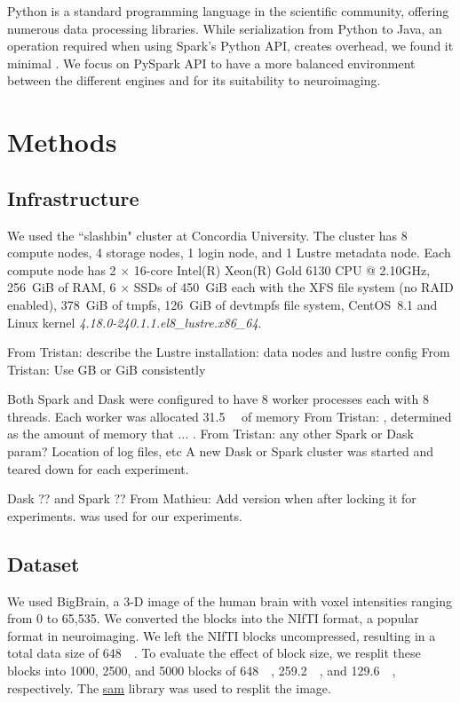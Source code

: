 \documentclass[conference]{IEEEtran}
\newcommand{\TG}[1]{\color{cyan}From Tristan: #1 \color{black}}
\newcommand{\MD}[1]{\color{magenta}From Mathieu: #1 \color{black}}
\begin{document}
Python is a standard programming language in the scientific community, offering numerous data processing libraries.
While serialization from Python to Java, an operation required when using Spark's Python API, creates overhead, we found it minimal \cite{8943502}.
We focus on PySpark API to have a more balanced environment between the different engines and for its suitability to neuroimaging.

\section{Methods}
\subsection{Infrastructure}
We used the ``slashbin" cluster at Concordia University.
The cluster has 8 compute nodes, 4 storage nodes, 1 login node, and 1
Lustre metadata node. Each
compute node has 2 $\times$ 16-core Intel(R) Xeon(R) Gold 6130 CPU
@ 2.10GHz, 256~GiB of RAM, 6 $\times$ SSDs of 450~GiB each with the XFS
file system (no RAID enabled), 378~GiB of tmpfs, 126~GiB of devtmpfs file system,
CentOS~8.1 and Linux kernel
\textit{4.18.0-240.1.1.el8\_lustre.x86\_64}.

\TG{describe the Lustre installation: data nodes and lustre config}
\TG{Use GB or GiB consistently}

Both Spark and Dask were configured to have 8 worker processes each with 8
threads. Each worker was allocated \SI{31.5}{\giga\byte} of memory \TG{,
determined as the amount of memory that ...}. \TG{any other Spark or Dask
param? Location of log files, etc} A new Dask or Spark cluster was started and
teared down for each experiment.

Dask ?? and Spark ?? \MD{Add version when after locking it for experiments.} was used for our experiments.

\subsection{Dataset}
We used BigBrain\cite{Amunts:13}, a 3-D image of the human brain with voxel
intensities ranging from 0 to 65,535. We converted the blocks into the
NIfTI format, a popular format in neuroimaging. We left the NIfTI blocks
uncompressed, resulting in a total data size of \SI{648}{\giga\byte}. To
evaluate the effect of block size, we resplit these blocks into 1000, 2500,
and 5000 blocks of \SI{648}{\mega\byte}, \SI{259.2}{\mega\byte}, and
\SI{129.6}{\mega\byte}, respectively. The
\href{https://github.com/big-data-lab-team/sam}{sam} library was used to
resplit the image.
\end{document}
